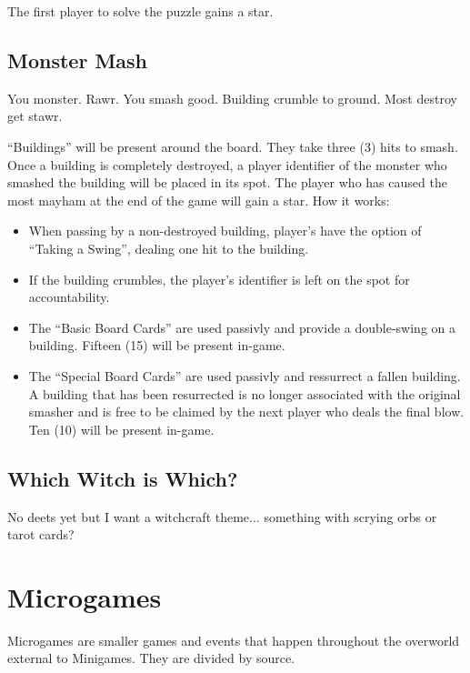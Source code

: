 \documentclass{article}
\begin{document}
\noindent
The first player to solve the puzzle gains a star.

\subsection{Monster Mash}

You monster.  Rawr.  You smash good.  Building crumble to ground.  Most destroy
get stawr.


\noindent
``Buildings'' will be present around the board.  They take three (3) hits to smash.
Once a building is completely destroyed, a player identifier of the monster who
smashed the building will be placed in its spot.  The player who has caused
the most mayham at the end of the game will gain a star.  How it works:

\begin{itemize}
\item When passing by a non-destroyed building, player's have the option of
``Taking a Swing'', dealing one hit to the building.

\item If the building crumbles, the player's identifier is left on the spot
for accountability.

\item The ``Basic Board Cards'' are used passivly and provide a double-swing
on a building.  Fifteen (15) will be present in-game.

\item The ``Special Board Cards'' are used passivly and ressurrect a fallen
building.  A building that has been resurrected is no longer associated with
the original smasher and is free to be claimed by the next player who deals
the final blow.  Ten (10) will be present in-game.
\end{itemize}

\subsection{Which Witch is Which?}

No deets yet but I want a witchcraft theme... something with scrying orbs or
tarot cards?

\section{Microgames}

Microgames are smaller games and events that happen throughout the overworld external
to Minigames.  They are divided by source.
\end{document}
